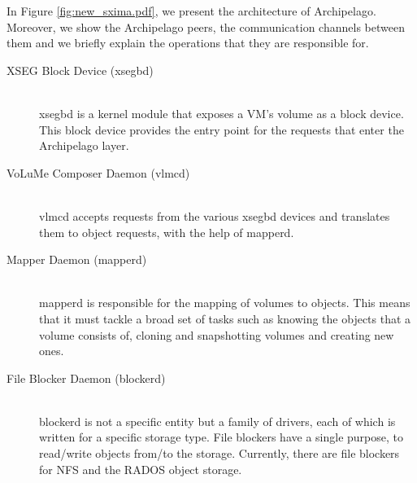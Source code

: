 In Figure \ref{fig:new_sxima.pdf}, we present the architecture of Archipelago.  
Moreover, we show the Archipelago peers, the communication channels between 
them and we briefly explain the operations that they are responsible for.


\begin{description}
	\item[XSEG Block Device (xsegbd)] \hfill \\
		xsegbd is a kernel module that exposes a VM's volume as a block 
		device. This block device provides the entry point for the 
		requests that enter the Archipelago layer.
	\item[VoLuMe Composer Daemon (vlmcd)] \hfill \\
		vlmcd accepts requests from the various xsegbd devices and 
		translates them to object requests, with the help of mapperd.
	\item[Mapper Daemon (mapperd)] \hfill \\
		mapperd is responsible for the mapping of volumes to objects.  
		This means that it must tackle a broad set of tasks such as 
		knowing the objects that a volume consists of, cloning and 
		snapshotting volumes and creating new ones.
	\item[File Blocker Daemon (blockerd)] \hfill \\
		blockerd is not a specific entity but a family of drivers, each 
		of which is written for a specific storage type. File blockers 
		have a single purpose, to read/write objects from/to the 
		storage. Currently, there are file blockers for NFS and the 
		RADOS object storage.
\end{description}


